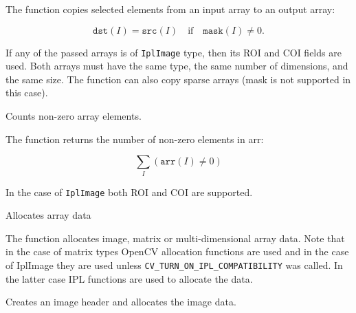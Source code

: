 The function copies selected elements from an input array to an output array:

\[
\texttt{dst}(I)=\texttt{src}(I) \quad \text{if} \quad \texttt{mask}(I) \ne 0.
\]

If any of the passed arrays is of \texttt{IplImage} type, then its ROI
and COI fields are used. Both arrays must have the same type, the same
number of dimensions, and the same size. The function can also copy sparse
arrays (mask is not supported in this case).

Counts non-zero array elements.


\begin{description}
\end{description}


The function returns the number of non-zero elements in arr:

\[ \sum_I (\texttt{arr}(I) \ne 0) \]

In the case of \texttt{IplImage} both ROI and COI are supported.


Allocates array data


\begin{description}
\end{description}


The function allocates image, matrix or
multi-dimensional array data. Note that in the case of matrix types OpenCV
allocation functions are used and in the case of IplImage they are used
unless \texttt{CV\_TURN\_ON\_IPL\_COMPATIBILITY} was called. In the
latter case IPL functions are used to allocate the data.

Creates an image header and allocates the image data.


\begin{description}
\end{description}

